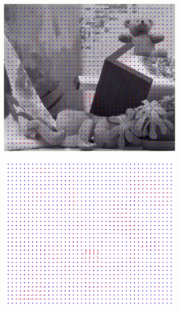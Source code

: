 \documentclass[a4paper,11]{article}
\begin{document}
\begin{figure}[H]
  \begin{subfigure}{0.5\textwidth}
   \centering
   \includegraphics[width=0.8\linewidth]{Teddy/result_31x31.png}
   \end{subfigure}
   \begin{subfigure}{0.5\textwidth}
    \centering
    \includegraphics[width=0.8\linewidth]{Teddy/flow_31x31.png}
   \end{subfigure} 
     
     \end{figure}
     
\end{document}
